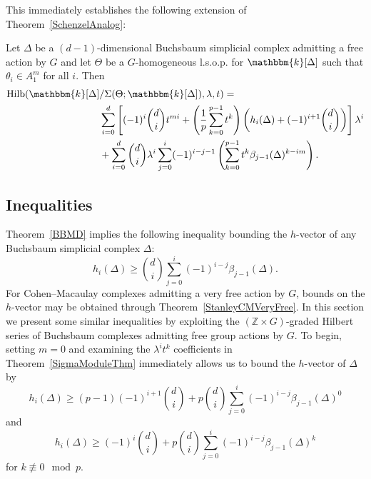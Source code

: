 \documentclass[ALCO,ThmDefs,Unicode]{cedram}
\DeclareMathOperator{\Hilb}{Hilb}
\newcommand{\field}{\mathbbm{k}}
\newcommand{\ZZ}{{\mathbb Z}}
\begin{document}
This immediately establishes the following extension of Theorem~\ref{SchenzelAnalog}:

\begin{theo}\label{SigmaModuleThm}
Let $\Delta$ be a $(d-1)$-dimensional Buchsbaum simplicial complex admitting a free action by $G$ and let $\Theta$ be a $G$-homogeneous l.s.o.p. for $\field[\Delta]$ such that $\theta_i\in A_1^m$ for all $i$. Then
\begin{align*}
\Hilb(\field[\Delta]&/\Sigma(\Theta;\field[\Delta]), \lambda, t)=\\
&\sum_{i=0}^d\left[(-1)^i\binom{d}{i}t^{mi}+\left(\frac{1}{p}\sum_{k=0}^{p-1}t^k\right)\left(h_i(\Delta)+(-1)^{i+1}\binom{d}{i}\right)\right]\lambda^i\\
&+\sum_{i=0}^d\binom{d}{i}\lambda^i\sum_{j=0}^{i}(-1)^{i-j-1}\left(\sum_{k=0}^{p-1}t^k\beta_{j-1}(\Delta)^{k-im} \right).
\end{align*}
\end{theo}



\subsection{Inequalities}\label{Inequalities}
Theorem~\ref{BBMD} implies the following inequality bounding the $h$-vector of any Buchsbaum simplicial complex $\Delta$:
\begin{equation}\label{buchsbaumInequality}
h_i(\Delta)\ge \binom{d}{i}\sum_{j=0}^i(-1)^{i-j}\beta_{j-1}(\Delta).
\end{equation}
For Cohen--Macaulay complexes admitting a very free action by $G$, bounds on the $h$-vector may be obtained through Theorem~\ref{StanleyCMVeryFree}. In this section we present some similar inequalities by exploiting the $(\ZZ\times G)$-graded Hilbert series of Buchsbaum complexes admitting free group actions by $G$. To begin, setting $m=0$ and examining the $\lambda^it^{k}$ coefficients in Theorem~\ref{SigmaModuleThm} immediately allows us to bound the $h$-vector of $\Delta$ by
\begin{equation}\label{zeropart}
h_i(\Delta)\ge(p-1)(-1)^{i+1}\binom{d}{i}+p\binom{d}{i}\sum_{j=0}^i(-1)^{i-j}\beta_{j-1}(\Delta)^0
\end{equation}
and
\begin{equation}\label{nonzeropart}
h_i(\Delta)\ge(-1)^{i}\binom{d}{i}+p\binom{d}{i}\sum_{j=0}^i(-1)^{i-j}\beta_{j-1}(\Delta)^k
\end{equation}
for $k\not\equiv 0 \mod p$.
\end{document}
